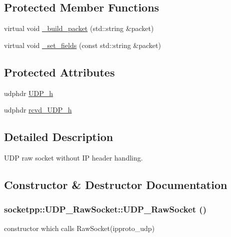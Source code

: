 \subsection*{Protected Member Functions}
\begin{CompactItemize}
\item 
virtual void \hyperlink{classsocketpp_1_1UDP__RawSocket_fe8cc7391c23dcf011f285b1605cad6b}{\_\-build\_\-packet} (std::string \&packet)
\item 
virtual void \hyperlink{classsocketpp_1_1UDP__RawSocket_a2dd7ab190a6730f9272eced4e648b50}{\_\-set\_\-fields} (const std::string \&packet)
\end{CompactItemize}
\subsection*{Protected Attributes}
\begin{CompactItemize}
\item 
udphdr \hyperlink{classsocketpp_1_1UDP__RawSocket_fbdcc519279aec772f575237ca25f783}{UDP\_\-h}
\item 
udphdr \hyperlink{classsocketpp_1_1UDP__RawSocket_9b21e1b520434f7b07d5afcc35ceb76c}{rcvd\_\-UDP\_\-h}
\end{CompactItemize}


\subsection{Detailed Description}
UDP raw socket without IP header handling. 

\subsection{Constructor \& Destructor Documentation}
\hypertarget{classsocketpp_1_1UDP__RawSocket_508aba470eee4010ca16007823c91650}{
\subsubsection[{UDP\_\-RawSocket}]{\setlength{\rightskip}{0pt plus 5cm}socketpp::UDP\_\-RawSocket::UDP\_\-RawSocket ()}}
\label{classsocketpp_1_1UDP__RawSocket_508aba470eee4010ca16007823c91650}


constructor which calls RawSocket(ipproto\_\-udp) 



